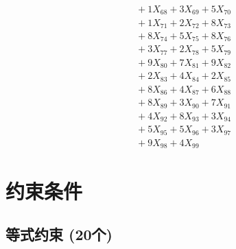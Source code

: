 \documentclass[a4paper,10pt]{article}
\begin{document}
{\begin{align}
&\;  + 1 X_{68} + 3 X_{69} + 5 X_{70} \\[0.3ex]
&\;  + 1 X_{71} + 2 X_{72} + 8 X_{73} \\[0.3ex]
&\;  + 8 X_{74} + 5 X_{75} + 8 X_{76} \\[0.3ex]
&\;  + 3 X_{77} + 2 X_{78} + 5 X_{79} \\[0.5ex]\allowbreak
&\;  + 9 X_{80} + 7 X_{81} + 9 X_{82} \\[0.3ex]
&\;  + 2 X_{83} + 4 X_{84} + 2 X_{85} \\[0.3ex]
&\;  + 8 X_{86} + 4 X_{87} + 6 X_{88} \\[0.3ex]
&\;  + 8 X_{89} + 3 X_{90} + 7 X_{91} \\[0.3ex]
&\;  + 4 X_{92} + 8 X_{93} + 3 X_{94} \\[0.3ex]
&\;  + 5 X_{95} + 5 X_{96} + 3 X_{97} \\[0.3ex]
&\;  + 9 X_{98} + 4 X_{99}\nonumber
\end{align}
}

\section{约束条件}

\subsection{等式约束 (20个)}
\end{document}

